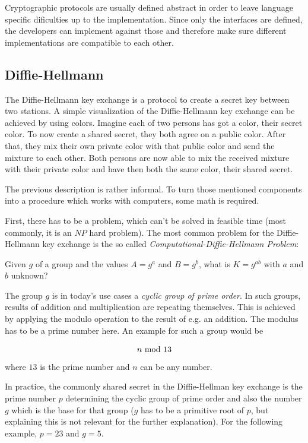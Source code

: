 Cryptographic protocols are usually defined abstract in order to leave language
specific dificulties up to the implementation. Since only the interfaces are
defined, the developers can implement against those and therefore make sure
different implementations are compatible to each other.

\subsection{Diffie-Hellmann}

The Diffie-Hellmann key exchange is a protocol to create a secret key between
two stations. A simple visualization of the Diffie-Hellmann key exchange can
be achieved by using colors. Imagine each of two persons has got a color,
their secret color. To now create a shared secret, they both agree on a
public color. After that, they mix their own private color with that public
color and send the mixture to each other. Both persons are now able to mix
the received mixture with their private color and have then both the same
color, their shared secret.

The previous description is rather informal. To turn those mentioned components
into a procedure which works with computers, some math is required.

First, there has to be a problem, which can't be solved in feasible time
(most commonly, it is an $NP$ hard problem). The most common problem for
the Diffie-Hellmann key exchange is the so called
\textit{Computational-Diffie-Hellmann Problem}:

\vspace{1em}

Given $g$ of a group and the values $A = g^a$ and $B = g^b$, what is
$K = g^{ab}$ with $a$ and $b$ unknown?

\vspace{1em}

The group $g$ is in today's use cases a \textit{cyclic group of prime order}.
In such groups, results of addition and multiplication are repeating
themselves. This is achieved by applying the modulo operation to the result
of e.g. an addition. The modulus has to be a prime number here. An example
for such a group would be

$$n \ \text{mod}\ 13$$ where $13$ is the prime number and $n$ can be any number.

In practice, the commonly shared secret in the Diffie-Hellman key exchange
is the prime number $p$ determining the cyclic group of prime order and also
the number $g$ which is the base for that group ($g$ has to be a primitive
root of $p$, but explaining this is not relevant for the further explanation).
For the following example, $p = 23$ and $g = 5$.

